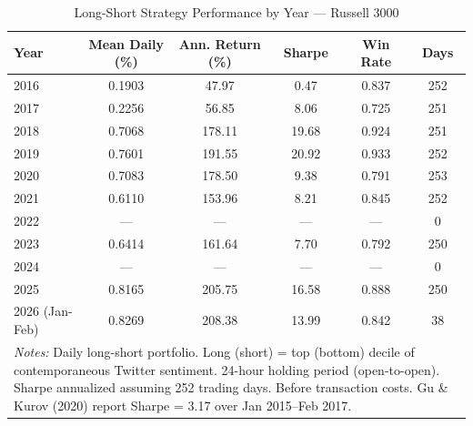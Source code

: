 \begin{table}[htbp]
\centering
\caption{Long-Short Strategy Performance by Year --- Russell 3000}
\label{tab:russel_ls_annual}
\begin{tabular}{lccccc}
\hline\hline
Year & Mean Daily (\%) & Ann. Return (\%) & Sharpe & Win Rate & Days \\
\hline
  2016 & 0.1903 & 47.97 & 0.47 & 0.837 & 252 \\
  2017 & 0.2256 & 56.85 & 8.06 & 0.725 & 251 \\
  2018 & 0.7068 & 178.11 & 19.68 & 0.924 & 251 \\
  2019 & 0.7601 & 191.55 & 20.92 & 0.933 & 252 \\
  2020 & 0.7083 & 178.50 & 9.38 & 0.791 & 253 \\
  2021 & 0.6110 & 153.96 & 8.21 & 0.845 & 252 \\
  2022 & --- & --- & --- & --- & 0 \\
  2023 & 0.6414 & 161.64 & 7.70 & 0.792 & 250 \\
  2024 & --- & --- & --- & --- & 0 \\
  2025 & 0.8165 & 205.75 & 16.58 & 0.888 & 250 \\
  2026 (Jan-Feb) & 0.8269 & 208.38 & 13.99 & 0.842 & 38 \\
\hline\hline
\multicolumn{6}{p{0.95\linewidth}}{\footnotesize \textit{Notes:} Daily long-short portfolio. Long (short) = top (bottom) decile of contemporaneous Twitter sentiment. 24-hour holding period (open-to-open). Sharpe annualized assuming 252 trading days. Before transaction costs. Gu \& Kurov (2020) report Sharpe = 3.17 over Jan 2015--Feb 2017.} \\
\end{tabular}
\end{table}